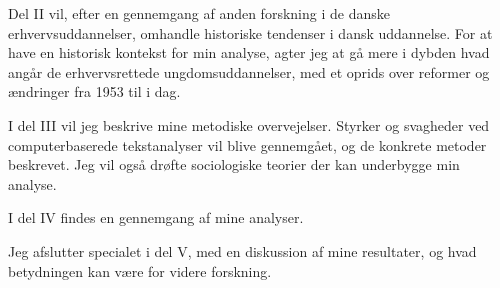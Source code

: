 Del II vil, efter en gennemgang af anden forskning i de danske erhvervsuddannelser, omhandle historiske tendenser i dansk uddannelse.
For at have en historisk kontekst for min analyse, agter jeg at gå mere i dybden hvad angår de erhvervsrettede ungdomsuddannelser, med et oprids over reformer og ændringer fra 1953 til i dag.

I del III vil jeg beskrive mine metodiske overvejelser.
Styrker og svagheder ved computerbaserede tekstanalyser vil blive gennemgået, og de konkrete metoder beskrevet.
Jeg vil også drøfte sociologiske teorier der kan underbygge min analyse. 

I del IV findes en gennemgang af mine analyser.

Jeg afslutter specialet i del V, med en diskussion af mine resultater, og hvad betydningen kan være for videre forskning.

